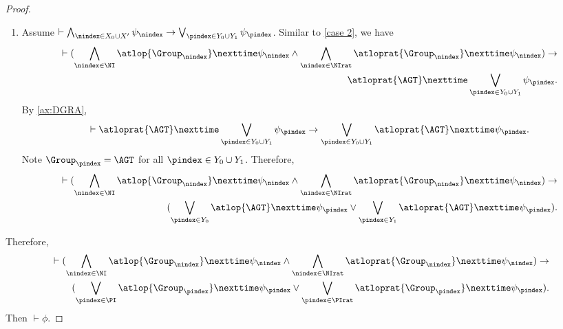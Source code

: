 \begin{proof}
\begin{enumerate}[label={Case \arabic*}]
  
    \item Assume $\vdash \bigwedge_{\nindex\in X_0\cup X'} \psi_\nindex \to \bigvee_{\pindex\in Y_0\cup Y_1}\psi_{\pindex}$.
    Similar to \ref{case 2}, we have \begin{align*}
        \vdash 
    (\bigwedge_{\nindex\in \NI}\atlop{\Group_\nindex}\nexttime \psi_\nindex 
    \wedge 
    \bigwedge_{\nindex\in \NIrat}\atloprat{\Group_\nindex}\nexttime \psi_\nindex)
    \to \\
    \atloprat{\AGT}\nexttime \bigvee_{\pindex\in Y_0\cup Y_1}\psi_{\pindex}.
    \end{align*}
    By \ref{ax:DGRA},  \begin{align*}
        \vdash 
    \atloprat{\AGT}\nexttime \bigvee_{\pindex\in Y_0\cup Y_1}\psi_{\pindex}
    \to \bigvee_{\pindex\in Y_0\cup Y_1}\atloprat{\AGT}\nexttime \psi_{\pindex}.
    \end{align*}
    Note $\Group_{\pindex} = \AGT $ for all $\pindex\in Y_0\cup Y_1$. 
    Therefore, \begin{align*}
    \vdash 
    (\bigwedge_{\nindex\in \NI}\atlop{\Group_\nindex}\nexttime \psi_\nindex 
    \wedge 
    \bigwedge_{\nindex\in \NIrat}\atloprat{\Group_\nindex}\nexttime \psi_\nindex)
    \to \\ 
    (\bigvee_{\pindex\in Y_0}\atlop{\AGT}\nexttime \psi_{\pindex}\vee \bigvee_{\pindex\in Y_1}\atloprat{\AGT}\nexttime \psi_{\pindex}).
    \end{align*}
  \end{enumerate}
  Therefore, \begin{align*}
      \vdash 
    (\bigwedge_{\nindex\in \NI}\atlop{\Group_\nindex}\nexttime \psi_\nindex 
    \wedge 
    \bigwedge_{\nindex\in \NIrat}\atloprat{\Group_\nindex}\nexttime \psi_\nindex)
    \to \\
    (\bigvee_{\pindex\in \PI}\atlop{\Group_\pindex}\nexttime \psi_{\pindex}\vee \bigvee_{\pindex\in \PIrat}\atloprat{\Group_\pindex}\nexttime \psi_{\pindex}).
    \end{align*}
    Then $\vdash \phi $.
  \end{proof}

